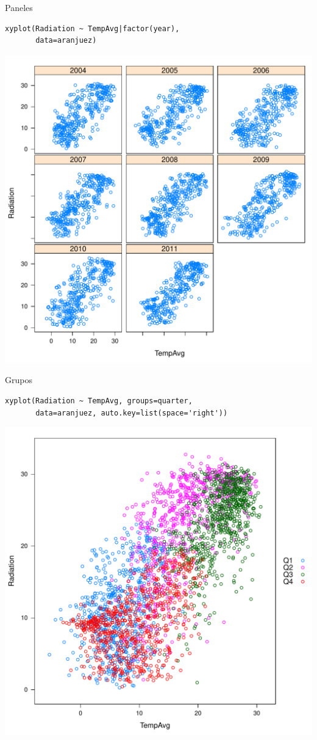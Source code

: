 \documentclass[xcolor={usenames,svgnames,dvipsnames}]{beamer}
\begin{document}
\begin{frame}[fragile,label=sec-2-1-6]{Paneles}
 \lstset{language=R,numbers=none}
\begin{lstlisting}
xyplot(Radiation ~ TempAvg|factor(year),
       data=aranjuez)
\end{lstlisting}

\includegraphics[width=.9\linewidth]{figs/xyplotYear.pdf}
\end{frame}
\begin{frame}[fragile,label=sec-2-1-7]{Grupos}
 \lstset{language=R,numbers=none}
\begin{lstlisting}
xyplot(Radiation ~ TempAvg, groups=quarter,
       data=aranjuez, auto.key=list(space='right'))
\end{lstlisting}

\includegraphics[width=.9\linewidth]{figs/xyplotQuarter.pdf}
\end{frame}
\end{document}
